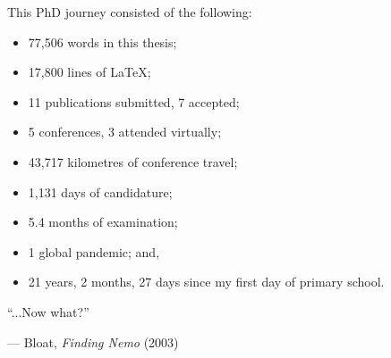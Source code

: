
\cleardoublepage
\thispagestyle{empty}

\vspace*{\fill}

\rmfamily

This PhD journey consisted of the following:

\bigskip

\begin{itemize}
    \item 77,506 words in this thesis;
    \item 17,800 lines of \LaTeX;
    \item 11 publications submitted, 7 accepted;
    \item 5 conferences, 3 attended virtually;
    \item 43,717 kilometres of conference travel;
    \item 1,131 days of candidature; %
    \item 5.4 months of examination; %
    \item 1 global pandemic; and,
    \item 21 years, 2 months, 27 days since my first day of primary school.
\end{itemize}

\bigskip


\epigraph{``...Now what?''}{--- Bloat, \textit{Finding Nemo} (2003)}
\vspace*{\fill}